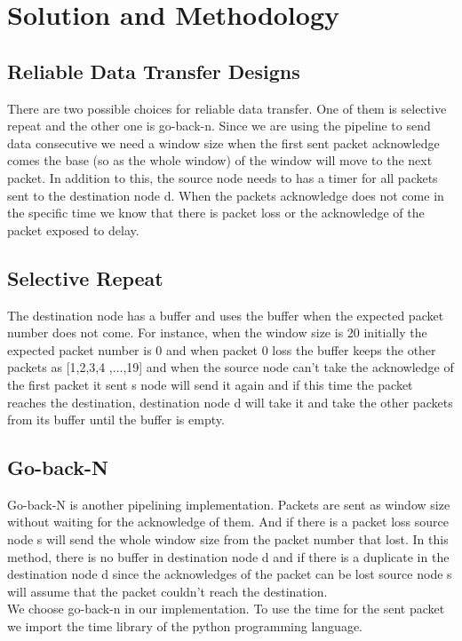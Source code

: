 \documentclass[conference]{IEEEtran}
\begin{document}
\section{Solution and Methodology}

\subsection{Reliable Data Transfer Designs}

There are two possible choices for reliable data transfer. One of them is selective repeat and the other one is go-back-n. Since we are using the pipeline to send data consecutive we need a window size when the first sent packet acknowledge comes the base (so as the whole window) of the window will move to the next packet. In addition to this, the source node needs to has a timer for all packets sent to the destination node d. When the packets acknowledge does not come in the specific time we know that there is packet loss or the acknowledge of the packet exposed to delay.

\subsection{Selective Repeat}

The destination node has a buffer and uses the buffer when the expected packet number does not come. For instance, when the window size is 20 initially the expected packet number is 0 and when packet 0 loss the buffer keeps the other packets as [1,2,3,4 ,...,19] and when the source node can't take the acknowledge of the first packet it sent s node will send it again and if this time the packet reaches the destination, destination node d will take it and take the other packets from its buffer until the buffer is empty.

\subsection{Go-back-N}

Go-back-N is another pipelining implementation. Packets are sent as window size without waiting for the acknowledge of them. And if there is a packet loss source node s will send the whole window size from the packet number that lost. In this method, there is no buffer in destination node d and if there is a duplicate in the destination node d since the acknowledges of the packet can be lost source node s will assume that the packet couldn't reach the destination. \\
We choose go-back-n in our implementation. To use the time for the sent packet we import the time library of the python programming language. \\
\end{document}
